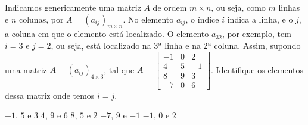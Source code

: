 Indicamos genericamente uma matriz $A$ de ordem $m\times n$, ou seja, como $m$ linhas e $n$ colunas, por $A=(a_{ij})_{m\times n}$. No elemento $a_{ij}$, o índice $i$ indica a linha, e o $j$, a coluna em que o elemento está localizado. O elemento $a_{32}$, por exemplo, tem $i=3$ e $j=2$, ou seja, está localizado na 3ª linha e na 2ª coluna. Assim, supondo uma matriz $A=(a_{ij})_{4\times 3}$, tal que $A = \left[ \begin{array}{ccc}
-1 & 0 & 2 \\
4 & 5 & -1 \\
8 & 9 & 3  \\
-7 & 0 & 6
\end{array} \right]$. Identifique os elementos dessa matriz onde temos $i=j$.

$-1$, $5$ e $3$
$4$, $9$ e $6$
$8$, $5$ e $2$
$-7$, $9$ e $-1$
$-1$, $0$ e $2$


